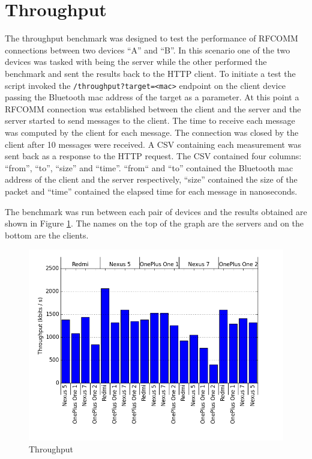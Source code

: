 \section{Throughput}
The throughput benchmark was designed to test the performance of RFCOMM connections between two devices ``A'' and ``B''.
In this scenario one of the two devices was tasked with being the server while the other performed the benchmark and sent the results back to the HTTP client.
To initiate a test the script invoked the \texttt{/throughput?target=<mac>} endpoint on the client device passing the Bluetooth mac address of the target as a parameter.
At this point a RFCOMM connection was established between the client and the server and the server started to send messages to the client.
The time to receive each message was computed by the client for each message.
The connection was closed by the client after 10 messages were received.
A CSV containing each measurement was sent back as a response to the HTTP request.
The CSV contained four columns: ``from'', ``to'', ``size'' and ``time''.
``from`` and ``to'' contained the Bluetooth mac address of the client and the server respectively, ``size'' contained the size of the packet and ``time'' contained the elapsed time for each message in nanoseconds.

The benchmark was run between each pair of devices and the results obtained are shown in Figure \ref{figure:throughput}.
The names on the top of the graph are the servers and on the bottom are the clients. 

\begin{figure}[ht!]
  \centering
  \includegraphics[width=1.0\textwidth]{img/throughput.png} 
  \caption{Throughput}
  \label{figure:throughput}
\end{figure}



